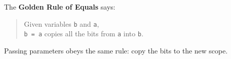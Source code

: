 The \textbf{Golden Rule of Equals} says:

\begin{quote}
Given variables \lstinline$b$ and \lstinline$a$, \\
\lstinline$b = a$ copies all the bits from \lstinline$a$ into \lstinline$b$.
\end{quote}

Passing parameters obeys the same rule: copy the bits to the new scope.
